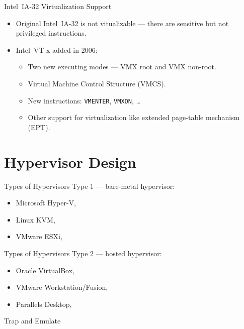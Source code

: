 \begin{frame}{Intel\reg~IA-32 Virtualization Support}
\begin{itemize}
\item Original Intel\reg~IA-32 is not vitualizable --- there are sensitive but
  not privileged instructions.
\item Intel\reg~VT-x added in 2006:
  \begin{itemize}
  \item Two new executing modes --- VMX root and VMX non-root.
  \item Virtual Machine Control Structure (VMCS).
  \item New instructions: \texttt{VMENTER}, \texttt{VMXON}, \dots
  \item Other support for virtualization like extended page-table mechanism
    (EPT).
  \end{itemize}
\end{itemize}
\end{frame}


\section{Hypervisor Design}

\begin{frame}{Types of Hypervisors}
Type 1 --- bare-metal hypervisor:
\begin{itemize}
\item Microsoft Hyper-V,
\item Linux KVM,
\item VMware ESXi,
\end{itemize}
\vfill
\centering
{}
\end{frame}

\begin{frame}{Types of Hypervisors}
Type 2 --- hosted hypervisor:
\begin{itemize}
\item Oracle VirtualBox,
\item VMware Workstation/Fusion,
\item Parallels Desktop,
\end{itemize}
\vfill
\centering
{}
\end{frame}

\begin{frame}{Trap and Emulate}
\centering
{}
\end{frame}

